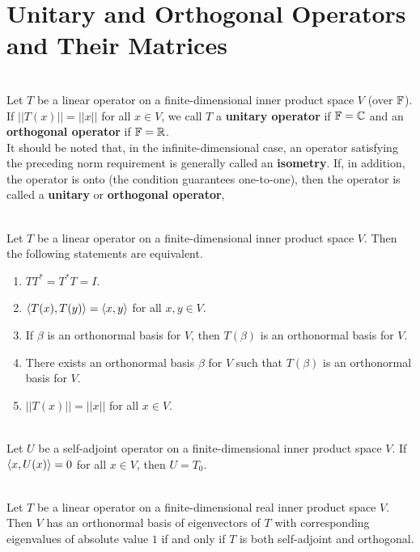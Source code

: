 \section{Unitary and Orthogonal Operators and Their Matrices}

\begin{definition}
	\hfill\\
	Let $T$ be a linear operator on a finite-dimensional inner product space $V$ (over $\mathbb{F}$). If $||T(x)|| = ||x||$ for all $x \in V$, we call $T$ a \textbf{unitary operator} if $\mathbb{F} = \mathbb{C}$ and an \textbf{orthogonal operator} if $\mathbb{F} = \mathbb{R}$.\\

	It should be noted that, in the infinite-dimensional case, an operator satisfying the preceding norm requirement is generally called an \textbf{isometry}. If, in addition, the operator is onto (the condition guarantees one-to-one), then the operator is called a \textbf{unitary} or \textbf{orthogonal operator},
\end{definition}

\begin{theorem}
	\hfill\\
	Let $T$ be a linear operator on a finite-dimensional inner product space $V$. Then the following statements are equivalent.

	\begin{enumerate}
		\item $TT^* = T^*T = I$.
		\item $\langle T(x), T(y)\rangle = \langle x,y\rangle$ for all $x,y \in V$.
		\item If $\beta$ is an orthonormal basis for $V$, then $T(\beta)$ is an orthonormal basis for $V$.
		\item There exists an orthonormal basis $\beta$ for $V$ such that $T(\beta)$ is an orthonormal basis for $V$.
		\item $||T(x)|| = ||x||$ for all $x \in V$.
	\end{enumerate}
\end{theorem}

\begin{lemma}
	\hfill\\
	Let $U$ be a self-adjoint operator on a finite-dimensional inner product space $V$. If $\langle x,U(x)\rangle = 0$ for all $x \in V$, then $U = T_0$.
\end{lemma}

\begin{corollary}
	\hfill\\
	Let $T$ be a linear operator on a finite-dimensional real inner product space $V$. Then $V$ has an orthonormal basis of eigenvectors of $T$ with corresponding eigenvalues of absolute value $1$ if and only if $T$ is both self-adjoint and orthogonal.
\end{corollary}

